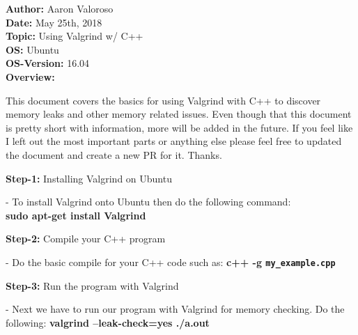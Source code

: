 \documentclass[11pt, a4papper]{article}
\begin{document}
\noindent\textbf{Author: } Aaron Valoroso \\
\textbf{Date: } May 25th, 2018 \\
\textbf{Topic: } Using Valgrind w/ C++ \\
\textbf{OS: } Ubuntu \\
\textbf{OS-Version: } 16.04 \\[1cm]

\textbf{Overview: } \\
\begin{adjustwidth}{3cm}{} 
This document covers the basics for using Valgrind with C++ to discover memory leaks and other memory related issues. Even though that this document is pretty short with information, more will be added in the future. If you feel like I left out the most important parts or anything else please feel free to updated the document and create a new PR for it. Thanks. \\
\end{adjustwidth}

\textbf{Step-1: } Installing Valgrind on Ubuntu \\
\begin{adjustwidth}{3cm}{} 
- To install Valgrind onto Ubuntu then do the following command:  \\
\noindent \textbf{sudo apt-get install Valgrind} \\
\end{adjustwidth}

\textbf{Step-2: } Compile your C++ program \\
\begin{adjustwidth}{3cm}{} 
- Do the basic compile for your C++ code such as: \textbf{c++ -g \texttt{my\_example.cpp}} \\
\end{adjustwidth}

\textbf{Step-3: } Run the program with Valgrind \\
\begin{adjustwidth}{3cm}{} 
- Next we have to run our program with Valgrind for memory checking. Do the following: \textbf{valgrind --leak-check=yes ./a.out}
\end{adjustwidth}
\end{document}
